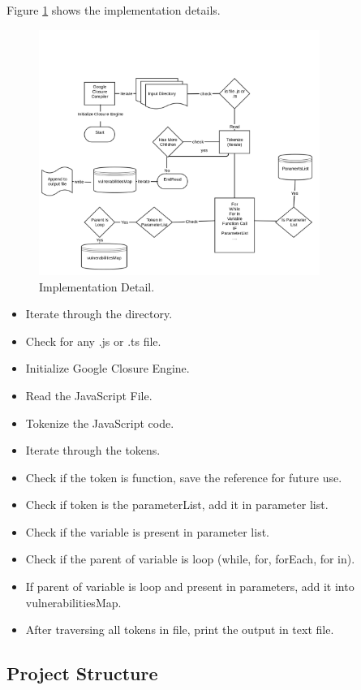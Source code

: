 \documentclass[authoryear,preprint]{sigplanconf}
\begin{document}
Figure \ref{f:workflow} shows the implementation details.
\begin{figure}[ht]
\centering
\includegraphics[height=8cm]{figures/workflow}
\caption[Implementation Detail]{\label{f:workflow}Implementation Detail.}
\end{figure}

\begin{itemize}
\item Iterate through the directory.
\item Check for any .js or .ts file.
\item Initialize Google Closure Engine.
\item Read the JavaScript File.
\item Tokenize the JavaScript code.
\item Iterate through the tokens.
\item Check if the token is function, save the reference for future use.
\item Check if token is the parameterList, add it in parameter list.
\item Check if the variable is present in parameter list.
\item Check if the parent of variable is loop (while, for, forEach, for in).
\item If parent of variable is loop and present in parameters, add it into vulnerabilitiesMap.
\item After traversing all tokens in file, print the output in text file.
\end{itemize}

\subsection{Project Structure}
\end{document}
